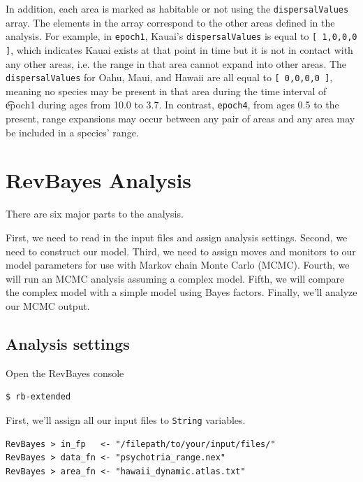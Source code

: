 \documentclass[11pt]{article}
\begin{document}
In addition, each area is marked as habitable or not using the {\tt dispersalValues} array.
The elements in the array correspond to the other areas defined in the analysis.
For example, in {\tt epoch1}, Kauai's {\tt dispersalValues} is equal to {\tt [ 1,0,0,0 ]}, which indicates Kauai exists at that point in time but it is not in contact with any other areas, i.e. the range in that area cannot expand into other areas.
The {\tt dispersalValues} for Oahu, Maui, and Hawaii are all equal to {\tt [ 0,0,0,0 ]}, meaning no species may be present in that area during the time interval of {\t epoch1} during ages from 10.0 to 3.7. In contrast, {\tt epoch4}, from ages 0.5 to the present, range expansions may occur between any pair of areas and any area may be included in a species' range.

\section{RevBayes Analysis}

There are six major parts to the analysis.

First, we need to read in the input files and assign analysis settings.
Second, we need to construct our model.
Third, we need to assign moves and monitors to our model parameters for use with Markov chain Monte Carlo (MCMC).
Fourth, we will run an MCMC analysis assuming a complex model.
Fifth, we will compare the complex model with a simple model using Bayes factors.
Finally, we'll analyze our MCMC output.

\subsection{Analysis settings}

\setlength{\parindent}{0pt}

Open the RevBayes console

\begin{snugshade}
\begin{lstlisting}
$ rb-extended
\end{lstlisting}
\end{snugshade}

First, we'll assign all our input files to {\tt String} variables.
\begin{snugshade}
\begin{lstlisting}
RevBayes > in_fp   <- "/filepath/to/your/input/files/"
RevBayes > data_fn <- "psychotria_range.nex"
RevBayes > area_fn <- "hawaii_dynamic.atlas.txt"
\end{lstlisting}
\end{snugshade}
\end{document}
